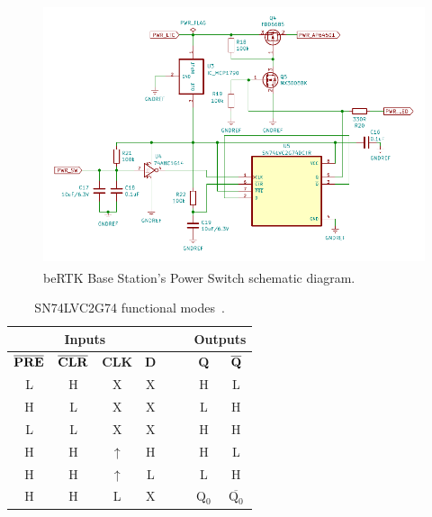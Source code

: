 \begin{figure}[h]
    \centering
    \includegraphics[width=1.0\textwidth]{Chapters/Figures/chapter3/Power_Switch.pdf}
    \caption{beRTK\textsuperscript{\textregistered} Base Station's Power Switch schematic diagram.}
    \label{fig:SWITCH_circuit}
\end{figure}

\begingroup
\begin{table}[h]
    \caption{SN74LVC2G74 functional modes~\cite{SN74LVC2G74DCTR}.}
    \label{tab:SN74LVC2G74DCTR}
    \centering%
    \begin{tabular}{cccccccc}
        \toprule
		
		\multicolumn{4}{c}{\textbf{Inputs}} &&& \multicolumn{2}{c}{\textbf{Outputs}} \\
        \midrule
        $\mathbf{\overline{\mbox{\textbf{PRE}}}}$ & $\mathbf{\overline{\mbox{\textbf{CLR}}}}$ & \textbf{CLK} & \textbf{D} &&& \textbf{Q} & $\mathbf{\overline{\mbox{\textbf{Q}}}}$ \\
        \midrule
		L & H & X & X &&& H & L \\
		\midrule
		H & L & X & X &&& L & H \\
		\midrule
		L & L & X & X &&& H & H \\
		\midrule
		H & H & $\uparrow$ & H &&& H & L \\
		\midrule
		H & H & $\uparrow$ & L &&& L & H \\
		\midrule
		H & H & L & X &&& Q$_0$ & $\overline{\mbox{Q$_0$}}$ \\
        \bottomrule
    \end{tabular}
\end{table}
\endgroup

